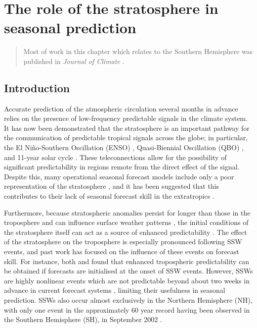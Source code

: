 \chapter{The role of the stratosphere in seasonal prediction}
\label{cha:seas}

\begin{quotation}
  Most of work in this chapter which relates to the Southern Hemisphere was
  published in \emph{Journal of Climate} \citep{Seviour2014}.
\end{quotation}


\section{Introduction}
\label{sec:seas-introduction}

Accurate prediction of the atmospheric circulation several months in advance
relies on the presence of low-frequency predictable signals in the climate
system. It has now been demonstrated that the stratosphere is an important
pathway for the communication of predictable tropical signals across the globe;
in particular, the El Ni\~no-Southern Oscillation (ENSO) \citep{Bell2009,
  Ineson2009, Hurwitz2011}, Quasi-Biennial Oscillation (QBO)
\citep{Marshall2009, Garfinkel2011}, and 11-year solar cycle \citep{Haigh2003,
  Gray2013}. These teleconnections allow for the possibility of significant
predictability in regions remote from the direct effect of the signal. Despite
this, many operational seasonal forecast models include only a poor
representation of the stratosphere \citep{Maycock2011}, and it has been
suggested that this contributes to their lack of seasonal forecast skill in the
extratropics \citep{Smith2012}.

Furthermore, because stratospheric anomalies persist for longer than those in
the troposphere and can influence surface weather patterns
\citep[e.g.,][]{Baldwin2001a}, the initial conditions of the stratosphere itself
can act as a source of enhanced predictability \citep{Baldwin2003a,
  Charlton2003, Hardiman2011}. The effect of the stratosphere on the troposphere
is especially pronounced following SSW events, and past work has focused on the
influence of these events on forecast skill. For instance, both
\citet{Kuroda2008} and \citet{Sigmond2013} found that enhanced tropospheric
predictability can be obtained if forecasts are initialised at the onset of SSW
events. However, SSWs are highly nonlinear events which are not predictable
beyond about two weeks in advance in current forecast systems
\citep{Marshall2010,Taguchi2014}, limiting their usefulness in seasonal
prediction. SSWs also occur almost exclusively in the Northern Hemisphere (NH),
with only one event in the approximately 60 year record having been observed in
the Southern Hemisphere (SH), in September 2002 \citep{Roscoe2005}.

